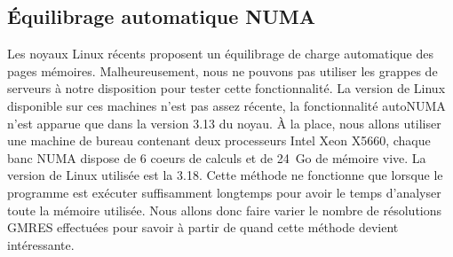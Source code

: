 \subsection{\'Equilibrage automatique NUMA}
Les noyaux Linux récents proposent un équilibrage de charge automatique des pages mémoires.
%
Malheureusement, nous ne pouvons pas utiliser les grappes de serveurs à notre disposition pour tester cette fonctionnalité.
%
La version de Linux disponible sur ces machines n'est pas assez récente, la fonctionnalité autoNUMA n'est apparue que dans la version 3.13 du noyau.
%
\`A la place, nous allons utiliser une machine de bureau contenant deux processeurs Intel Xeon X5660, chaque banc NUMA dispose de 6 coeurs de calculs et de 24~Go de mémoire vive.
%
La version de Linux utilisée est la 3.18.
%
Cette méthode ne fonctionne que lorsque le programme est exécuter suffisamment longtemps pour avoir le temps d'analyser toute la mémoire utilisée.
%
Nous allons donc faire varier le nombre de résolutions GMRES effectuées pour savoir à partir de quand cette méthode devient intéressante.
